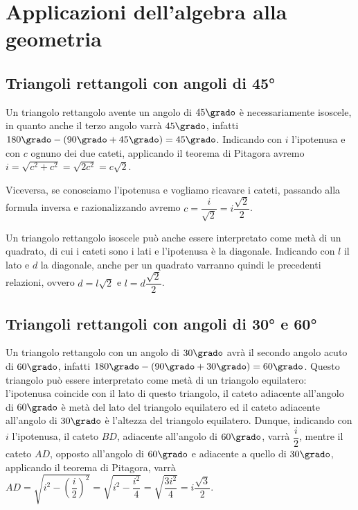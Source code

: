 \section{Applicazioni dell'algebra alla geometria}
\label{sect:applicazioni_algebra}

\subsection{Triangoli rettangoli con angoli di 45°}

\begin{wrapfigure}{r}{0.20\textwidth}
  \centering
\end{wrapfigure}
Un triangolo rettangolo avente un angolo di \(45\grado\) è 
necessariamente isoscele, in quanto anche il terzo angolo varrà 
\(45\grado\), infatti \(180\grado - (90\grado+45\grado)=45\grado\).
Indicando con \(i\) l'ipotenusa e con \(c\) ognuno dei due cateti, 
applicando il teorema di Pitagora avremo 
\(i=\sqrt{c^2+c^2}=\sqrt{2c^2}=c\sqrt{2}\).

Viceversa, se conosciamo l'ipotenusa e vogliamo ricavare i cateti, 
passando alla formula inversa e razionalizzando avremo 
\(c=\dfrac{i}{\sqrt{2}}=i\dfrac{\sqrt{2}}{2}\).

Un triangolo rettangolo isoscele può anche essere interpretato come 
metà di un quadrato, di cui i cateti sono i lati e l'ipotenusa è la 
diagonale.
Indicando con \(l\) il lato e \(d\) la diagonale, anche per un quadrato 
varranno quindi le precedenti relazioni, ovvero \(d=l\sqrt{2}\) e 
\(l=d\dfrac{\sqrt{2}}{2}\).


\subsection{Triangoli rettangoli con angoli di 30° e 60°}

\begin{wrapfigure}{r}{0.25\textwidth}
  \centering
\end{wrapfigure}
Un triangolo rettangolo con un angolo di \(30\grado\) avrà il secondo 
angolo acuto di \(60\grado\), infatti \(180\grado- 
(90\grado+30\grado)=60\grado\). Questo triangolo può essere 
interpretato come metà di un triangolo equilatero: l'ipotenusa 
coincide con il lato di questo triangolo, il cateto adiacente 
all'angolo di \(60\grado\) è metà del lato del triangolo equilatero ed 
il cateto adiacente all'angolo di \(30\grado\) è l'altezza del 
triangolo equilatero.
Dunque, indicando con \(i\) l'ipotenusa, il cateto \(BD\), adiacente 
all'angolo di \(60\grado\), varrà \(\dfrac{i}{2}\), mentre il cateto 
\(AD\), opposto all'angolo di \(60\grado\) e adiacente a quello di 
\(30\grado\), applicando il teorema di Pitagora, varrà 
\(AD=\sqrt{i^2-\left(\dfrac{i}{2}\right)^2}=\sqrt{i^2-\dfrac{i^2}{4}}
=\sqrt{\dfrac{3i^2}{4}}=i\dfrac{\sqrt{3}}{2}\).

